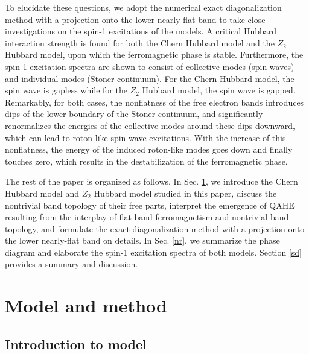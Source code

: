 \documentclass[amsmath,superscriptaddress,showpacs,aps,prb,twocolumn]{revtex4-1}
\begin{document}
\par To elucidate these questions, we adopt the numerical exact diagonalization method with a projection onto the lower nearly-flat band to take close investigations on the spin-1 excitations of the models. A critical Hubbard interaction strength is found for both the Chern Hubbard model and the $Z_2$ Hubbard model, upon which the ferromagnetic phase is stable. Furthermore, the spin-1 excitation spectra are shown to consist of collective modes (spin waves) and individual modes (Stoner continuum). For the Chern Hubbard model, the spin wave is gapless while for the $Z_2$ Hubbard model, the spin wave is gapped. Remarkably, for both cases, the nonflatness of the free electron bands introduces dips of the lower boundary of the Stoner continuum, and significantly renormalizes the energies of the collective modes around these dips downward, which can lead to roton-like spin wave excitations. With the increase of this nonflatness, the energy of the induced roton-like modes goes down and finally touches zero, which results in the destabilization of the ferromagnetic phase.

\par The rest of the paper is organized as follows. In Sec. \ref{mm}, we introduce the Chern Hubbard model and $Z_2$ Hubbard model studied in this paper, discuss the nontrivial band topology of their free parts, interpret the emergence of QAHE resulting from the interplay of flat-band ferromagnetism and nontrivial band topology, and formulate the exact diagonalization method with a projection onto the lower nearly-flat band on details. In Sec. \ref{nr}, we summarize the phase diagram and elaborate the spin-1 excitation spectra of both models. Section \ref{sd} provides a summary and discussion.

\section{Model and method}\label{mm}
\subsection{Introduction to model}\label{intro_to_model}
\end{document}
